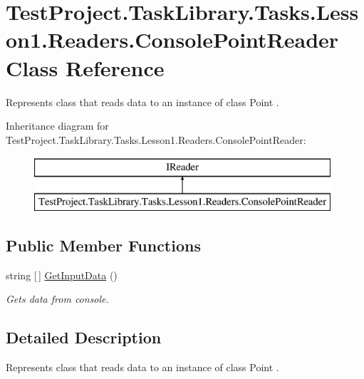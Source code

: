 \hypertarget{class_test_project_1_1_task_library_1_1_tasks_1_1_lesson1_1_1_readers_1_1_console_point_reader}{}\section{Test\+Project.\+Task\+Library.\+Tasks.\+Lesson1.\+Readers.\+Console\+Point\+Reader Class Reference}
\label{class_test_project_1_1_task_library_1_1_tasks_1_1_lesson1_1_1_readers_1_1_console_point_reader}


Represents class that reads data to an instance of class Point .  


Inheritance diagram for Test\+Project.\+Task\+Library.\+Tasks.\+Lesson1.\+Readers.\+Console\+Point\+Reader\+:\begin{figure}[H]
\begin{center}
\leavevmode
\includegraphics[height=2.000000cm]{class_test_project_1_1_task_library_1_1_tasks_1_1_lesson1_1_1_readers_1_1_console_point_reader}
\end{center}
\end{figure}
\subsection*{Public Member Functions}
\begin{DoxyCompactItemize}
\item 
string \mbox{[}$\,$\mbox{]} \mbox{\hyperlink{class_test_project_1_1_task_library_1_1_tasks_1_1_lesson1_1_1_readers_1_1_console_point_reader_a305558af0d9b26c2662a7eaabaa69e46}{Get\+Input\+Data}} ()
\begin{DoxyCompactList}\small\item\em Gets data from console. \end{DoxyCompactList}\end{DoxyCompactItemize}


\subsection{Detailed Description}
Represents class that reads data to an instance of class Point . 



